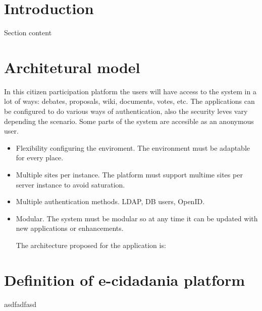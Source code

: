 \documentclass[12pt,a4paper]{article}
\begin{document}
\tableofcontents
\newpage

\section{Introduction}
Section content

\section{Architetural model}
In this citizen participation platform the users will have access to the system in a lot of ways: debates, proposals, wiki, documents, votes, etc. The applications can be configured to do various ways of authentication, also the security leves vary depending the scenario. Some parts of the system are accesible as an anonymous user.

\begin{itemize}
\item Flexibility configuring the enviroment. The environment must be adaptable for every place.
\item Multiple sites per instance. The platform must support multime sites per server instance to avoid saturation.
\item Multiple authentication methods. LDAP, DB users, OpenID.
\item Modular. The system must be modular so at any time it can be updated with new applications or enhancements.

The architecture proposed for the application is:

\end{itemize}

\section{Definition of e-cidadania platform}
asdfadfasd
\end{document}
